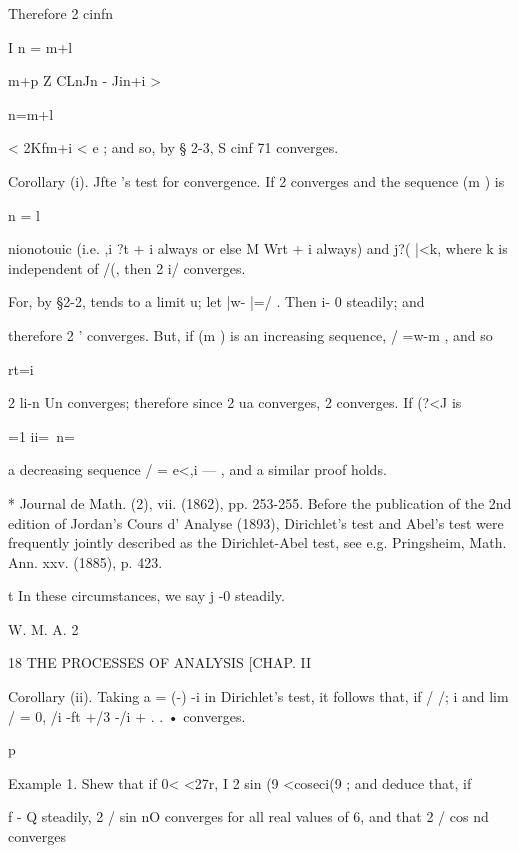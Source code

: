 Therefore 2 cinfn 

I n = m+l 



m+p 
Z CLnJn   - Jin+i > 



n=m+l 



< 2Kfm+i < e ; and so, by § 2-3, S cinf 71 converges. 



Corollary (i). Jfte 's test for convergence. If 2    converges and the sequence (m ) is 

n = l 

nionotouic (i.e.  ,i ?t  + i always or else M  Wrt + i always) and j?( |<k, where k is 
independent of /(, then 2   i/  converges. 

For, by §2-2,    tends to a limit u; let |w-  |=/ . Then  i- 0 steadily; and 

therefore 2    '  converges. But, if (m ) is an increasing sequence, / =w-m , and so 

rt=i 

2  li-n Un converges; therefore since 2 ua  converges, 2      converges. If (?<J is 

 =1 ii=\ n=\ 

a decreasing sequence /  = e<,i —  , and a similar proof holds. 

* Journal de Math. (2), vii. (1862), pp. 253-255. Before the publication of the 2nd edition 
of Jordan's Cours d' Analyse (1893), Dirichlet's test and Abel's test were frequently jointly described 
as the Dirichlet-Abel test, see e.g. Pringsheim, Math. Ann. xxv. (1885), p. 423. 

t In these circumstances, we say j -0 steadily. 

W. M. A. 2 



18 THE PROCESSES OF ANALYSIS [CHAP. II 

Corollary (ii). Taking a  = (-) -i in Dirichlet's test, it follows that, if /  /; i 
and lim /  = 0, /i -ft +/3 -/i + . . • converges. 



p 



Example 1. Shew that if 0< <27r, I 2 sin (9 <coseci(9 ; and deduce that, if 



f - Q steadily, 2 / sin nO converges for all real values of 6, and that 2 /  cos nd converges 

